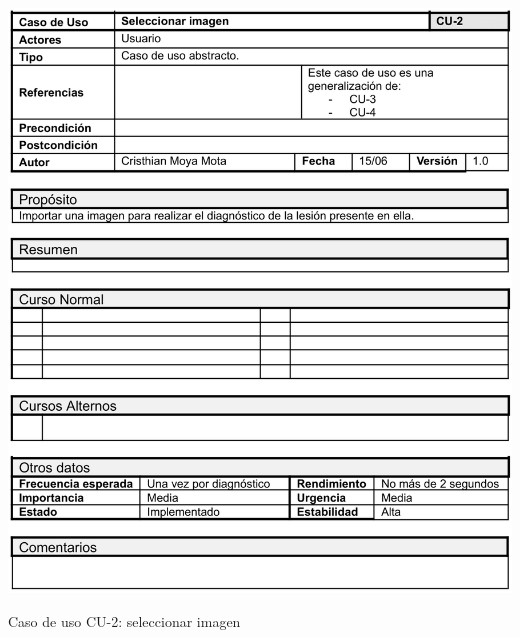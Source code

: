   \begin{table}[H]
	\centering
	\includegraphics[scale=0.85]{imagenes/cu-2.png}
	\caption{Caso de uso CU-2: seleccionar imagen}
	\label{fig:cu2}
\end{table}

